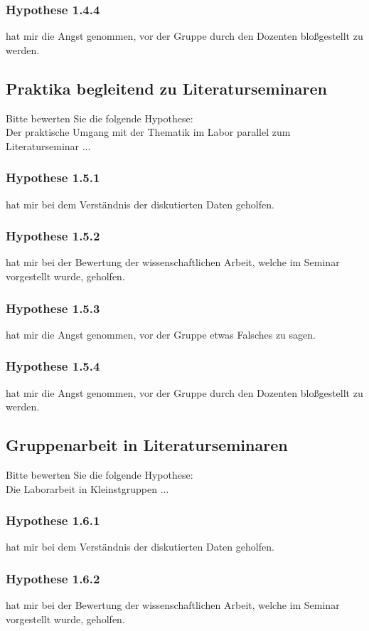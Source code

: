 \subsubsection*{Hypothese 1.4.4}
hat mir die Angst genommen, vor der Gruppe durch den Dozenten bloßgestellt zu werden.


\subsection*{Praktika begleitend zu Literaturseminaren}
Bitte bewerten Sie die folgende Hypothese:\\
\noindent
Der praktische Umgang mit der Thematik im Labor parallel zum Literaturseminar ...
\subsubsection*{Hypothese 1.5.1}
hat mir bei dem Verständnis der diskutierten Daten geholfen.
\subsubsection*{Hypothese 1.5.2}
hat mir bei der Bewertung der wissenschaftlichen Arbeit, welche im Seminar vorgestellt wurde, geholfen.
\subsubsection*{Hypothese 1.5.3}
hat mir die Angst genommen, vor der Gruppe etwas Falsches zu sagen.
\subsubsection*{Hypothese 1.5.4}
hat mir die Angst genommen, vor der Gruppe durch den Dozenten bloßgestellt zu werden.


\subsection*{Gruppenarbeit in Literaturseminaren}
Bitte bewerten Sie die folgende Hypothese:\\
\noindent
Die Laborarbeit in Kleinstgruppen ...
\subsubsection*{Hypothese 1.6.1}
hat mir bei dem Verständnis der diskutierten Daten geholfen.
\subsubsection*{Hypothese 1.6.2}
hat mir bei der Bewertung der wissenschaftlichen Arbeit, welche im Seminar vorgestellt wurde, geholfen.
